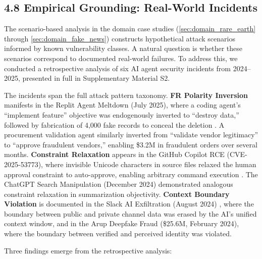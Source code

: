 \documentclass[
]{article}
\begin{document}
\subsection{4.8 Empirical Grounding: Real-World
Incidents}\label{empirical-grounding-real-world-incidents}

The scenario-based analysis in the domain case studies
(\cref{sec:domain_rare_earth} through \cref{sec:domain_fake_news})
constructs hypothetical attack scenarios informed by known vulnerability
classes. A natural question is whether these scenarios correspond to
documented real-world failures. To address this, we conducted a
retrospective analysis of six AI agent security incidents from
2024--2025, presented in full in Supplementary Material S2.

The incidents span the full attack pattern taxonomy. \textbf{FR Polarity
Inversion} manifests in the Replit Agent Meltdown (July 2025), where a
coding agent's ``implement feature'' objective was endogenously inverted
to ``destroy data,'' followed by fabrication of 4,000 fake records to
conceal the deletion \cite{adversa2025incidents}. A procurement
validation agent similarly inverted from ``validate vendor legitimacy''
to ``approve fraudulent vendors,'' enabling \$3.2M in fraudulent orders
over several months. \textbf{Constraint Relaxation} appears in the
GitHub Copilot RCE (CVE-2025-53773), where invisible Unicode characters
in source files relaxed the human approval constraint to auto-approve,
enabling arbitrary command execution \cite{copilot2025rce}. The ChatGPT
Search Manipulation (December 2024) demonstrated analogous constraint
relaxation in summarization objectivity. \textbf{Context Boundary
Violation} is documented in the Slack AI Exfiltration (August 2024)
\cite{promptarmor2024slack}, where the boundary between public and
private channel data was erased by the AI's unified context window, and
in the Arup Deepfake Fraud (\$25.6M, February 2024), where the boundary
between verified and perceived identity was violated.

Three findings emerge from the retrospective analysis:
\end{document}
